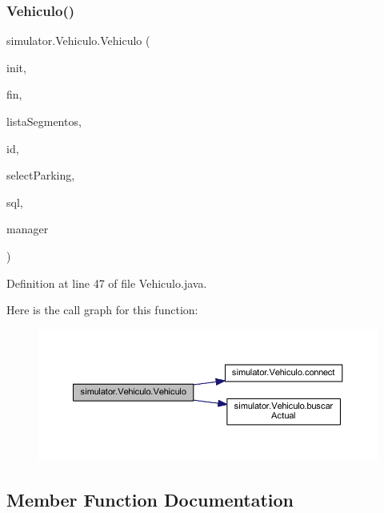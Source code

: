 \subsubsection{\texorpdfstring{Vehiculo()}{Vehiculo()}}
{\footnotesize\ttfamily simulator.\+Vehiculo.\+Vehiculo (\begin{DoxyParamCaption}\item[{Point}]{init,  }\item[{Point}]{fin,  }\item[{Array\+List$<$ \mbox{\hyperlink{classsimulator_1_1_segmento}{Segmento}} $>$}]{lista\+Segmentos,  }\item[{int}]{id,  }\item[{Semaphore}]{select\+Parking,  }\item[{Semaphore}]{sql,  }\item[{\mbox{\hyperlink{classsimulator_1_1_manager}{Manager}}}]{manager }\end{DoxyParamCaption})}



Definition at line 47 of file Vehiculo.\+java.

Here is the call graph for this function\+:\nopagebreak
\begin{figure}[H]
\begin{center}
\leavevmode
\includegraphics[width=350pt]{classsimulator_1_1_vehiculo_a1614333acce021409a3bfe74a88750d4_cgraph}
\end{center}
\end{figure}


\subsection{Member Function Documentation}
\mbox{\label{classsimulator_1_1_vehiculo_aca90600bc94ce6dd02ddd4e5b712e687}} 
